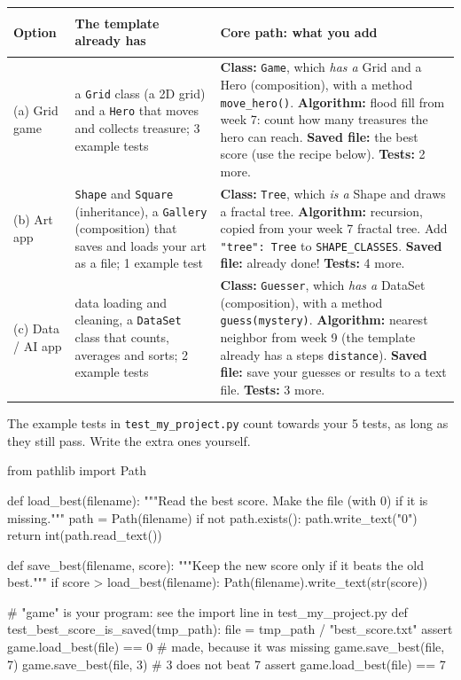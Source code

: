 \documentclass[level=3]{kidscode}
\begin{document}
\renewcommand{\arraystretch}{1.25}
\begin{longtable}{@{}>{\bfseries\raggedright\arraybackslash}p{2.3cm}>{\raggedright\arraybackslash}p{4.2cm}>{\raggedright\arraybackslash}p{\dimexpr\linewidth-6.5cm-4\tabcolsep}@{}}
\toprule
\rowcolor{kcaccent!15} Option & The template already has & Core path: what you add\\ \midrule\endhead
\bottomrule\endfoot
(a) Grid game & a \texttt{Grid} class (a 2D grid) and a \texttt{Hero} that moves and collects
treasure; 3 example tests &
\textbf{Class:} \texttt{Game}, which \emph{has a} Grid and a Hero (composition), with a
method \texttt{move\_hero()}.
\textbf{Algorithm:} flood fill from week 7: count how many treasures the hero can reach.
\textbf{Saved file:} the best score (use the recipe below).
\textbf{Tests:} 2 more.\\ \midrule
{(b)} Art app & \texttt{Shape} and \texttt{Square} (inheritance), a \texttt{Gallery}
(composition) that saves and loads your art as a file; 1 example test &
\textbf{Class:} \texttt{Tree}, which \emph{is a} Shape and draws a fractal tree.
\textbf{Algorithm:} recursion, copied from your week 7 fractal tree.
Add \texttt{"tree": Tree} to \texttt{SHAPE\_CLASSES}.
\textbf{Saved file:} already done!
\textbf{Tests:} 4 more.\\ \midrule
{(c)} Data / AI app & data loading and cleaning, a \texttt{DataSet} class that counts, averages and
sorts; 2 example tests &
\textbf{Class:} \texttt{Guesser}, which \emph{has a} DataSet (composition), with a method
\texttt{guess(mystery)}.
\textbf{Algorithm:} nearest neighbor from week 9 (the template already has a steps
\texttt{distance}).
\textbf{Saved file:} save your guesses or results to a text file.
\textbf{Tests:} 3 more.\\
\end{longtable}

The example tests in \texttt{test\_my\_project.py} count towards your 5 tests, as long as they
still pass. Write the extra ones yourself.

\begin{pycode}
from pathlib import Path

def load_best(filename):
    """Read the best score. Make the file (with 0) if it is missing."""
    path = Path(filename)
    if not path.exists():
        path.write_text("0")
    return int(path.read_text())

def save_best(filename, score):
    """Keep the new score only if it beats the old best."""
    if score > load_best(filename):
        Path(filename).write_text(str(score))
\end{pycode}
\begin{pycode}
# "game" is your program: see the import line in test_my_project.py
def test_best_score_is_saved(tmp_path):
    file = tmp_path / "best_score.txt"
    assert game.load_best(file) == 0      # made, because it was missing
    game.save_best(file, 7)
    game.save_best(file, 3)               # 3 does not beat 7
    assert game.load_best(file) == 7
\end{pycode}
\end{document}
